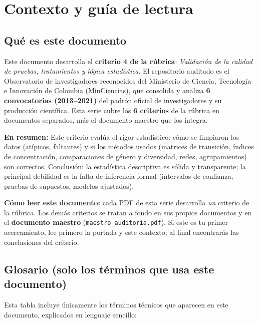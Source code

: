 \section{Contexto y guía de lectura}

\subsection{Qué es este documento}

Este documento desarrolla el \textbf{criterio 4 de la rúbrica}:
\emph{Validación de la calidad de pruebas, tratamientos y lógica estadística}. El repositorio auditado es el
Observatorio de investigadores reconocidos del Ministerio de Ciencia,
Tecnología e Innovación de Colombia (MinCiencias), que consolida y analiza
\textbf{6 convocatorias (2013--2021)} del padrón oficial de investigadores
y su producción científica. Esta serie cubre los \textbf{6 criterios} de la
rúbrica en documentos separados, más el documento maestro que los integra.

\textbf{En resumen:} Este criterio evalúa el rigor estadístico: cómo se limpiaron los datos (atípicos, faltantes) y si los métodos usados (matrices de transición, índices de concentración, comparaciones de género y diversidad, redes, agrupamientos) son correctos. Conclusión: la estadística descriptiva es sólida y transparente; la principal debilidad es la falta de inferencia formal (intervalos de confianza, pruebas de supuestos, modelos ajustados).




\begin{tcolorbox}[nota]
\textbf{Cómo leer este documento:} cada PDF de esta serie desarrolla \emph{un}
criterio de la rúbrica. Los demás criterios se tratan a fondo en sus propios
documentos y en el \textbf{documento maestro} (\texttt{maestro\_auditoria.pdf}).
Si este es tu primer acercamiento, lee primero la portada y este contexto; al
final encontrarás las conclusiones del criterio.
\end{tcolorbox}

\subsection{Glosario (solo los términos que usa este documento)}

Esta tabla incluye únicamente los términos técnicos que aparecen en este
documento, explicados en lenguaje sencillo:

